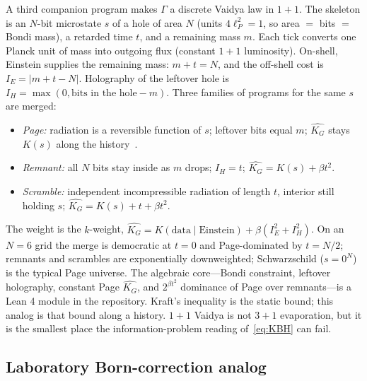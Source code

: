 \documentclass[11pt,a4paper]{article}
\theoremstyle{plain}
\theoremstyle{definition}
\theoremstyle{remark}
\newcommand{\KG}{K_{G}}
\newcommand{\abs}[1]{\lvert#1\rvert}
\begin{document}
A third companion program makes $\Gamma$ a discrete Vaidya law in $1{+}1$.
The skeleton is an $N$-bit microstate $s$ of a hole of area $N$ (units $4\ell_{P}^{2}=1$, so area $=$ bits $=$ Bondi mass), a retarded time $t$, and a remaining mass $m$.
Each tick converts one Planck unit of mass into outgoing flux (constant $1{+}1$ luminosity).
On-shell, Einstein supplies the remaining mass: $m+t=N$, and the off-shell cost is $I_{E}=\abs{m+t-N}$.
Holography of the leftover hole is $I_{H}=\max(0,\text{bits in the hole}-m)$.
Three families of programs for the same $s$ are merged:
\begin{itemize}
  \item \emph{Page:} radiation is a reversible function of $s$; leftover bits equal $m$; $\widehat{\KG}$ stays $K(s)$ along the history~\cite{page1993}.
  \item \emph{Remnant:} all $N$ bits stay inside as $m$ drops; $I_{H}=t$; $\widehat{\KG}=K(s)+\beta t^{2}$.
  \item \emph{Scramble:} independent incompressible radiation of length $t$, interior still holding $s$; $\widehat{\KG}=K(s)+t+\beta t^{2}$.
\end{itemize}
The weight is the $k$-weight,
$\widehat{\KG}=K(\mathrm{data}\mid\mathrm{Einstein})+\beta(I_{E}^{2}+I_{H}^{2})$.
On an $N=6$ grid the merge is democratic at $t=0$ and Page-dominated by $t=N/2$; remnants and scrambles are exponentially downweighted; Schwarzschild ($s=0^{N}$) is the typical Page universe.
The algebraic core---Bondi constraint, leftover holography, constant Page $\widehat{\KG}$, and $2^{\beta t^{2}}$ dominance of Page over remnants---is a Lean 4 module in the repository.
Kraft's inequality is the static bound; this analog is that bound along a history.
$1{+}1$ Vaidya is not $3{+}1$ evaporation, but it is the smallest place the information-problem reading of~\eqref{eq:KBH} can fail.

\subsection{Laboratory Born-correction analog}
\end{document}

